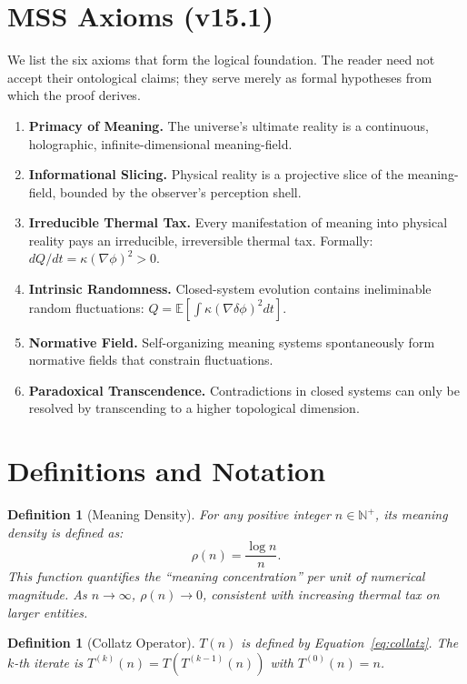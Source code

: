 \documentclass[11pt,a4paper]{article}
\newtheorem{definition}[theorem]{Definition}
\begin{document}
\section{MSS Axioms (v15.1)}
\label{sec:axioms}

We list the six axioms that form the logical foundation. The reader need not accept their ontological claims; they serve merely as formal hypotheses from which the proof derives.

\begin{enumerate}[A1:]
\item \textbf{Primacy of Meaning.} The universe's ultimate reality is a continuous, holographic, infinite-dimensional meaning-field.
\item \textbf{Informational Slicing.} Physical reality is a projective slice of the meaning-field, bounded by the observer's perception shell.
\item \textbf{Irreducible Thermal Tax.} Every manifestation of meaning into physical reality pays an irreducible, irreversible thermal tax. Formally: $dQ/dt = \kappa(\nabla\phi)^2 > 0$.
\item \textbf{Intrinsic Randomness.} Closed-system evolution contains ineliminable random fluctuations: $Q = \mathbb{E}[\int\kappa(\nabla\delta\phi)^2 dt]$.
\item \textbf{Normative Field.} Self-organizing meaning systems spontaneously form normative fields that constrain fluctuations.
\item \textbf{Paradoxical Transcendence.} Contradictions in closed systems can only be resolved by transcending to a higher topological dimension.
\end{enumerate}

\section{Definitions and Notation}
\label{sec:defs}

\begin{definition}[Meaning Density]
For any positive integer $n\in\mathbb{N}^+$, its \emph{meaning density} is defined as:
\begin{equation}
\rho(n) = \frac{\log n}{n}.
\end{equation}
This function quantifies the ``meaning concentration'' per unit of numerical magnitude. As $n\to\infty$, $\rho(n)\to 0$, consistent with increasing thermal tax on larger entities.
\end{definition}

\begin{definition}[Collatz Operator]
$T(n)$ is defined by Equation~\eqref{eq:collatz}. The $k$-th iterate is $T^{(k)}(n) = T(T^{(k-1)}(n))$ with $T^{(0)}(n)=n$.
\end{definition}
\end{document}
